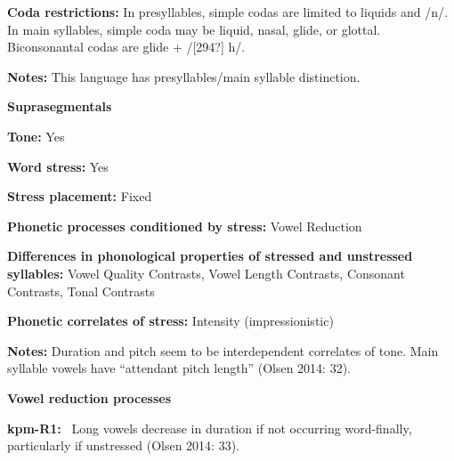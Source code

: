 \begin{styleBody}
\textbf{Coda restrictions: }In presyllables, simple codas are limited to liquids and /n/. In main syllables, simple coda may be liquid, nasal, glide, or glottal. Biconsonantal codas are glide + /[294?] h/.
\end{styleBody}

\begin{styleBody}
\textbf{Notes: }This language has presyllables/main syllable distinction.
\end{styleBody}

\begin{styleBody}
\textbf{Suprasegmentals}
\end{styleBody}

\begin{styleBody}
\textbf{Tone:} Yes
\end{styleBody}

\begin{styleBody}
\textbf{Word stress: }Yes
\end{styleBody}

\begin{styleBody}
\textbf{Stress placement:} Fixed
\end{styleBody}

\begin{styleBody}
\textbf{Phonetic processes conditioned by stress:} Vowel Reduction
\end{styleBody}

\begin{styleBody}
\textbf{Differences in phonological properties of stressed and unstressed syllables:} Vowel Quality Contrasts, Vowel Length Contrasts, Consonant Contrasts, Tonal Contrasts
\end{styleBody}

\begin{styleBody}
\textbf{Phonetic correlates of stress: }Intensity (impressionistic)
\end{styleBody}

\begin{styleBody}
\textbf{Notes: }Duration and pitch seem to be interdependent correlates of tone. Main syllable vowels have “attendant pitch length” (Olsen 2014: 32).
\end{styleBody}

\begin{styleBody}
\textbf{Vowel reduction processes}
\end{styleBody}

\begin{styleBody}
\textbf{kpm-R1: }\ Long vowels decrease in duration if not occurring word-finally, particularly if unstressed (Olsen 2014: 33).
\end{styleBody}

